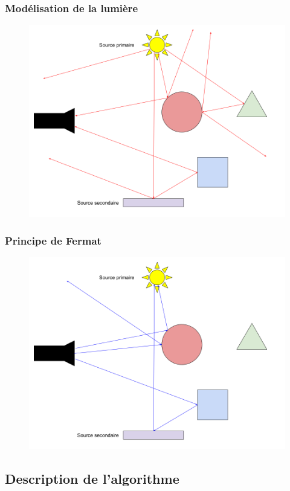 \documentclass[handout]{beamer}
\begin{document}
\begin{frame}
    \frametitle{Modélisation de la lumière}
    \begin{figure}
        \includegraphics[scale=0.3]{Lumiere.png}
    \end{figure}
\end{frame}

\begin{frame}
    \frametitle{Principe de Fermat}
    \begin{figure}
        \includegraphics[scale=0.3]{Fermat.png}
    \end{figure}
\end{frame}

\subsection{Description de l'algorithme}
\end{document}
